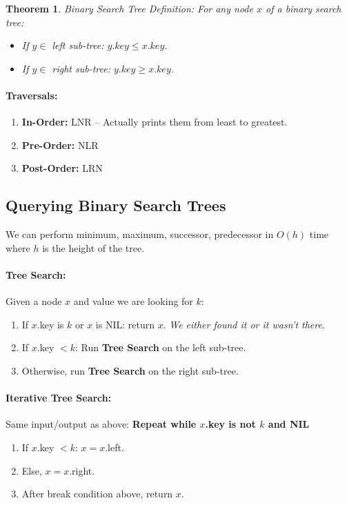 \documentclass[a4paper,12pt]{report}
\newtheorem{theorem}{Theorem}
\begin{document}
\begin{theorem}{Binary Search Tree Definition:}
For any node $x$ of a binary search tree: 
\begin{itemize}
\item If $y\in $ left sub-tree: $y.key \leq x.key$.
\item If $y\in $ right sub-tree: $y.key \geq x.key$.
\end{itemize}
\end{theorem}


\paragraph{Traversals: } 
\begin{enumerate}
\item \textbf{In-Order: } LNR -- Actually prints them from least to greatest.
\item \textbf{Pre-Order: } NLR
\item \textbf{Post-Order: } LRN
\end{enumerate}


\subsection{Querying Binary Search Trees}

We can perform minimum, maximum, successor, predecessor in $O(h)$ time where $h$ is the height of the tree.

\paragraph{Tree Search: } Given a node $x$ and value we are looking for $k$:
\begin{enumerate}
\item If $x$.key is $k$ or $x$ is NIL: return $x$. \textit{We either found it or it wasn't there}.
\item If $x$.key $< k$: Run \textbf{Tree Search} on the left sub-tree.
\item Otherwise, run \textbf{Tree Search} on the right sub-tree.
\end{enumerate}

\paragraph{Iterative Tree Search: } Same input/output as above: \textbf{Repeat while $x$.key is not $k$ and NIL} 
\begin{enumerate}
\item If $x$.key $<k$: $x = x$.left.
\item Else, $x = x$.right.
\item After break condition above, return $x$.
\end{enumerate}
\end{document}
